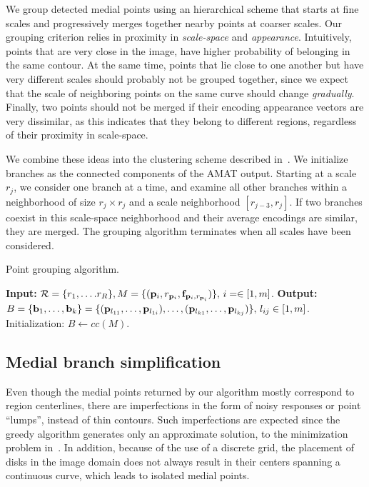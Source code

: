 \documentclass[10pt,twocolumn,letterpaper]{article}
\begin{document}
We group detected medial points using an hierarchical scheme that starts at fine scales and
progressively merges together nearby points at coarser scales.
Our grouping criterion relies in proximity in \emph{scale-space} and \emph{appearance}.
Intuitively, points that are very close in the image, have higher probability of belonging in the
same contour.
At the same time, points that lie close to one another but have very different scales should 
probably not be grouped together, since we expect that the scale of neighboring points on the same
curve should change \emph{gradually}.
Finally, two points should not be merged if their encoding appearance vectors are very dissimilar,
as this indicates that they belong to different regions, regardless of their proximity in scale-space.

We combine these ideas into the clustering scheme described in~.
We initialize branches as the connected components of the AMAT output.
Starting at a scale $r_j$, we consider one branch at a time, and examine all other
branches within a neighborhood of size $r_j \times r_j$ and a scale neighborhood $[r_{j-3},r_j]$.
If two branches coexist in this scale-space neighborhood and their average encodings are similar,
they are merged.
The grouping algorithm terminates when all scales have been considered.

\begin{algorithm}[t]
\caption{Point grouping algorithm.}
\label{alg:grouping}
	\begin{algorithmic}[1]
	\Statex \textbf{Input:} $\set{R}=\{ r_1,\ldots.r_R \}, \newline M=\{ (\p{i},r_{\p{i}},\mathbf{f}_{\p{i},r_{\p{i}}}) \}, \, i=\in[1,m]$.
	\Statex \textbf{Output:} $B= \{ \mathbf{b}_1,\ldots,\mathbf{b}_k \} = \newline \{ (\p{l_{11}},\ldots,\p{l_{1i}}), \ldots, (\p{l_{k1}},\ldots,\p{l_{kj}}) \},\, l_{ij}\in[1,m]$.
	\State Initialization: $B \leftarrow cc(M)$. 
		\EndFor
	\EndFor
	\end{algorithmic}
\end{algorithm}


\subsection{Medial branch simplification}\label{sec:method:simplification}
Even though the medial points returned by our algorithm mostly correspond to region centerlines,
there are imperfections in the form of noisy responses or point ``lumps'', instead of thin contours.
Such imperfections are expected since the greedy algorithm generates only an approximate solution,
to the minimization problem in~. 
In addition, because of the use of a discrete grid, the placement of disks 
in the image domain does not always result in their centers spanning a continuous curve, which leads to
isolated medial points.
\end{document}
